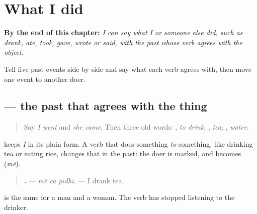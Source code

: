 
\chapter{What I did}
\label{ch:gu-what-i-did}

\begin{chapteropening}
\textbf{By the end of this chapter:} \emph{I can say what I or someone else did, such as drank, ate, took, gave, wrote or said, with the past whose verb agrees with the object.}

Tell five past events side by side and say what each verb agrees with, then move one event to another doer.
\end{chapteropening}

\section[\texorpdfstring{\gu{મેં} … \gu{પીધી} (mẽ … pīdhī)}{મેં … પીધી (mẽ … pīdhī)}]{   — the past that agrees with the thing}

\label{lesson:GU-C148-me-pidhi}



\begin{quote}
Say \emph{I went} and \emph{she came}. Then three old words: \textbf{}, \emph{to drink}; \textbf{}, \emph{tea}; \textbf{}, \emph{water}.
\end{quote}

\begin{grammarlens}[title={Grammar Lens: \gu{હું} becomes \gu{મેં}}]
\textbf{ } keeps \emph{I} in its plain form. A verb that does something \emph{to} something, like drinking tea or eating rice, changes that in the past: the doer is marked, and \textbf{} becomes \textbf{} (\emph{mẽ}).

\begin{quote}
\textbf{  .} — \emph{mẽ cā pīdhī.} — I drank tea.
\end{quote}

\textbf{} is the same for a man and a woman. The verb has stopped listening to the drinker.
\end{grammarlens}

